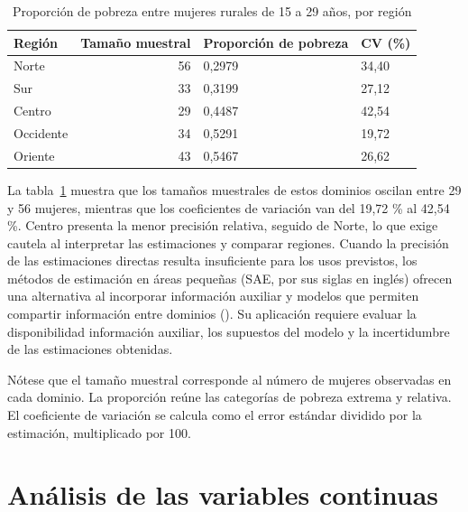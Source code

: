\documentclass[
  spanish,
  11pt,
  letterpaper,
  oneside,
  open=any]{scrbook}
\begin{document}
{

\begin{longtable}[]{@{}lrll@{}}

\caption{\label{tbl-pobreza-mujeres-rurales-jovenes}Proporción de
pobreza entre mujeres rurales de 15 a 29 años, por región}

\tabularnewline

\toprule\noalign{}
Región & Tamaño muestral & Proporción de pobreza & CV (\%) \\
\midrule\noalign{}
\endhead
\bottomrule\noalign{}
\endlastfoot
Norte & 56 & 0,2979 & 34,40 \\
Sur & 33 & 0,3199 & 27,12 \\
Centro & 29 & 0,4487 & 42,54 \\
Occidente & 34 & 0,5291 & 19,72 \\
Oriente & 43 & 0,5467 & 26,62 \\

\end{longtable}

}

La tabla~\ref{tbl-pobreza-mujeres-rurales-jovenes} muestra que los
tamaños muestrales de estos dominios oscilan entre 29 y 56 mujeres,
mientras que los coeficientes de variación van del 19,72 \% al 42,54 \%.
Centro presenta la menor precisión relativa, seguido de Norte, lo que
exige cautela al interpretar las estimaciones y comparar regiones.
Cuando la precisión de las estimaciones directas resulta insuficiente
para los usos previstos, los métodos de estimación en áreas pequeñas
(SAE, por sus siglas en inglés) ofrecen una alternativa al incorporar
información auxiliar y modelos que permiten compartir información entre
dominios (). Su
aplicación requiere evaluar la disponibilidad información auxiliar, los
supuestos del modelo y la incertidumbre de las estimaciones obtenidas.

Nótese que el tamaño muestral corresponde al número de mujeres
observadas en cada dominio. La proporción reúne las categorías de
pobreza extrema y relativa. El coeficiente de variación se calcula como
el error estándar dividido por la estimación, multiplicado por 100.


\chapter{Análisis de las variables continuas}\label{sec-cap-continuas}
\end{document}
